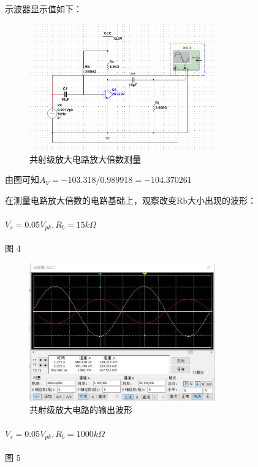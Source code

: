 \documentclass[10pt, conference, compsocconf, a4paper]{IEEEtran}
\begin{document}
示波器显示值如下：\par

\begin{figure}[h]
  \includegraphics[width=8cm]{img/b.png}
  \caption{共射级放大电路放大倍数测量}
\end{figure}

由图可知$A_V = -103.318 / 0.989918 = -104.370261$ \par
在测量电路放大倍数的电路基础上，观察改变Rb大小出现的波形：\par

\paragraph{$V_s = 0.05V_{pk} , R_b = 15k\Omega$}图 4

\begin{figure}[H]%
  \includegraphics[width=8cm]{img/c.png}
  \caption{共射级放大电路的输出波形}
\end{figure}


\paragraph{$V_{s} = 0.05V_{pk} , R_b = 1000k\Omega$}图 5
\end{document}
